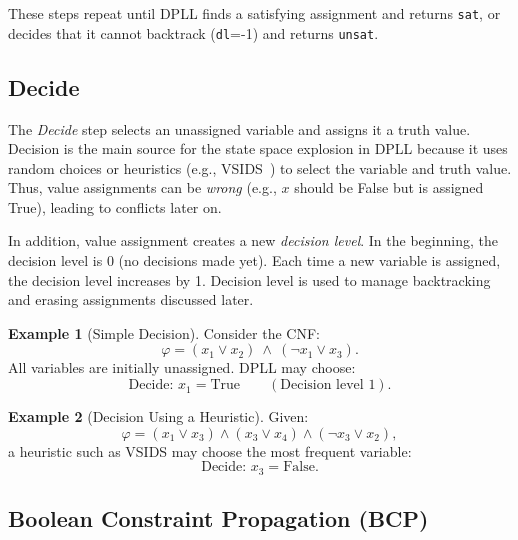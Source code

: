 \documentclass[oneside,11pt,dvipsnames]{book}
\numberwithin{equation}{section}
\theoremstyle{definition}
\newtheorem{example}{Example}[section]
\theoremstyle{remark}
\begin{document}
These steps repeat until DPLL finds  a satisfying assignment and returns \texttt{sat}, or decides that it cannot backtrack (\texttt{dl}=-1) and returns \texttt{unsat}.




\subsection{Decide}


The \emph{Decide} step selects an unassigned variable and assigns it a truth value.
Decision is the main source for the state space explosion in DPLL because it uses random choices or heuristics (e.g., VSIDS~\cite{moskewicz2001chaff}) to select the variable and truth value.
Thus, value assignments can be \emph{wrong} (e.g., $x$ should be False but is assigned True), leading to conflicts later on.

In addition, value assignment creates a new \emph{decision level}. In the beginning, the decision level is 0 (no decisions made yet). Each time a new variable is assigned, the decision level increases by 1.  Decision level is used to manage backtracking and erasing assignments discussed later.

\begin{example}[Simple Decision]
Consider the CNF:
\[
\varphi = (x_1 \lor x_2) \ \land\ (\lnot x_1 \lor x_3).
\]
All variables are initially unassigned.
DPLL may choose:
\[
\text{Decide: } x_1 = \text{True} \qquad (\text{Decision level } 1).
\]
\end{example}

\begin{example}[Decision Using a Heuristic]
Given:
\[
\varphi = (x_1 \lor x_3) \land (x_3 \lor x_4) \land (\lnot x_3 \lor x_2),
\]
a heuristic such as VSIDS may choose the most frequent variable:
\[
\text{Decide: } x_3 = \text{False}.
\]
\end{example}



\subsection{Boolean Constraint Propagation (BCP)}\label{sec:bcp}
\end{document}
